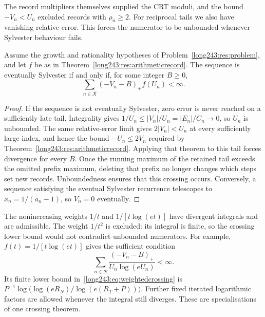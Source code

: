\documentclass[11pt]{article}
\begin{document}
The record multipliers themselves supplied the CRT moduli, and the
bound $-V_n<U_n$ excluded records with $\rho_n\ge2$.
For reciprocal tails we also have vanishing relative error. This
forces the numerator to be unbounded whenever Sylvester behaviour fails.

\begin{theorem}\label{long243:res:weightedrecord}
Assume the growth and rationality hypotheses of Problem~\ref{long243:res:problem},
and let $f$ be as in Theorem~\ref{long243:res:arithmeticrecord}. The sequence is
eventually Sylvester if and only if, for some integer $B\ge0$,
\[
 \sum_{n\in\mathcal R}(-V_n-B)_+f(U_n)<\infty.
\]
\end{theorem}

\begin{proof}
If the sequence is not eventually Sylvester, zero error is never reached on a sufficiently late
tail. Integrality gives $1/U_n\le|V_n|/U_n=|E_n|/C_n\to0$, so $U_n$ is
unbounded. The same relative-error limit gives $2|V_n|<U_n$ at every
sufficiently large index, and hence the bound $-U_n\le2V_n$ required
by Theorem~\ref{long243:res:arithmeticrecord}. Applying that theorem to
this tail forces divergence for every $B$. Once the running maximum of
the retained tail exceeds the omitted prefix maximum, deleting that
prefix no longer changes which steps set new records. Unboundedness
ensures that this crossing occurs. Conversely, a sequence satisfying
the eventual Sylvester recurrence
telescopes to $x_n=1/(a_n-1)$, so $V_n=0$ eventually.
\end{proof}

The nonincreasing weights $1/t$ and $1/[t\log(et)]$ have divergent
integrals and are admissible. The weight $1/t^2$ is excluded: its
integral is finite, so the crossing lower bound would not contradict
unbounded numerators. For example, $f(t)=1/[t\log(et)]$ gives
the sufficient condition
\[
 \sum_{n\in\mathcal R}\frac{(-V_n-B)_+}{U_n\log(eU_n)}<\infty.
\]
Its finite lower bound in~\eqref{long243:eq:weightedcrossing} is
$P^{-1}\log\bigl(\log(eR_N)/\log(e(R_T+P))\bigr)$.
Further fixed iterated logarithmic factors are allowed whenever the integral
still diverges. These are specialisations of one crossing theorem.
\end{document}
